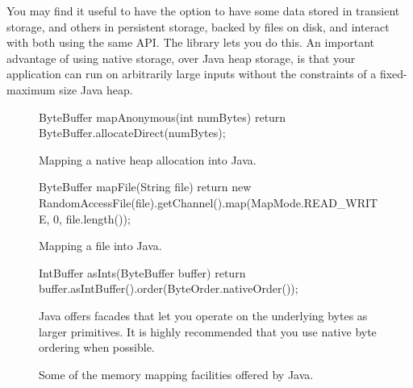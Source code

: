 You may find it useful to have the option to have some data stored in transient
storage, and others in persistent storage, backed by files on disk, and interact
with both using the same API. The  library lets you do this. An
important advantage of using native  storage, over Java heap
storage, is that your application can run on arbitrarily large inputs without the
constraints of a fixed-maximum size Java heap.


\begin{figure}
\centering
\begin{subfloat}
\begin{minipage}{0.99\textwidth}
\begin{figurelisting}
ByteBuffer mapAnonymous(int numBytes) {
  return ByteBuffer.allocateDirect(numBytes);
}
\end{figurelisting}
\end{minipage}
\caption{Mapping a native heap allocation into Java.}
\end{subfloat}
\begin{subfloat}
\begin{minipage}{0.99\textwidth}
\begin{figurelisting}
ByteBuffer mapFile(String file) {
  return new RandomAccessFile(file).getChannel().map(MapMode.READ_WRITE, 0, file.length());
}
\end{figurelisting}
\end{minipage}
\caption{Mapping a file into Java.}
\label{fig:java-nio-mapfile}
\end{subfloat}
\begin{subfloat}
\begin{minipage}{0.99\textwidth}
\begin{figurelisting}
IntBuffer asInts(ByteBuffer buffer) {
  return buffer.asIntBuffer().order(ByteOrder.nativeOrder());
}
\end{figurelisting}
\end{minipage}
\caption{Java offers facades that let you operate on the underlying bytes as
larger primitives. It is highly recommended that you use native byte ordering
when possible.}
\label{fig:java-nio-asintbuffer}
\end{subfloat}
\caption{Some of the memory mapping facilities offered by Java.}
\label{fig:java-nio}
\end{figure}

